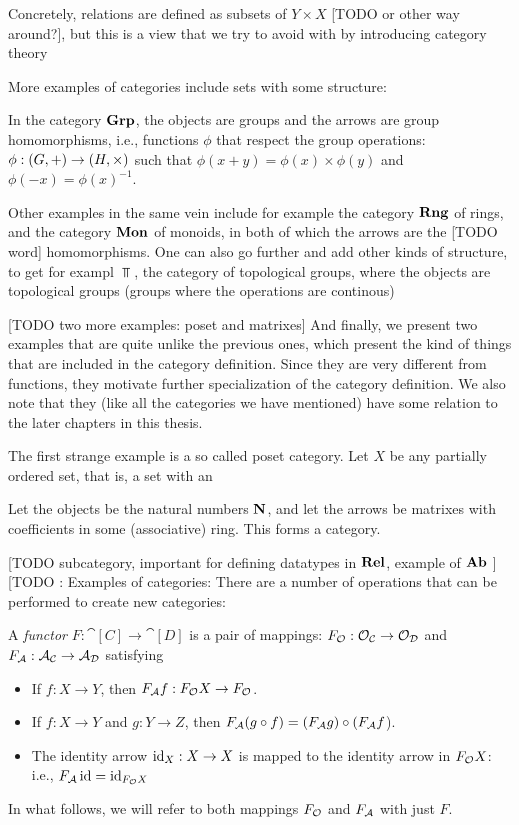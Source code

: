 \documentclass{article}
\begin{document}
Concretely, relations are defined as subsets of $Y \times X$ [TODO or other way around?], but this is a view that we try to avoid with by introducing category theory 

More examples of categories include sets with some structure:
\begin{Ex}
  In the category $\Grp$, the objects are groups and the arrows are group homomorphisms, i.e., functions $\phi$ that respect the group operations: $\phi : \grp{G}{+} \to \grp{H}{\times}$ such that $\phi(x + y) = \phi(x) \times \phi(y)$ and $\phi(-x) = \phi(x)^{-1}$.
\end{Ex}
\begin{Ex}
Other examples in the same vein include for example the category $\Rng$ of rings, and the category $\Mon$ of monoids, in both of which the arrows are the [TODO word] homomorphisms. One can also go further and add other kinds of structure, to get for exampl $\Top$, the category of topological groups, where the objects are topological groups (groups where the operations are continous)
\end{Ex}
[TODO two more examples: poset and matrixes]
And finally, we present two examples that are quite unlike the previous ones, which present the kind of things that are included in the category definition. Since they are very different from functions, they motivate further specialization of the category definition. We also note that they (like all the categories we have mentioned) have some relation to the later chapters in this thesis.
\begin{Ex}
The first strange example is a so called poset category. Let $X$ be any partially ordered set, that is, a set with an 
\end{Ex}
\begin{Ex}
Let the objects be the natural numbers $\N$, and let the arrows be matrixes with coefficients in some (associative) ring. This forms a category.
\end{Ex}
[TODO subcategory, important for defining datatypes in $\Rel$, example of $\Ab$ ]
[TODO : Examples of categories:
There are a number of operations that can be performed to create new categories:


\begin{Def}
A \emph{functor} $F : \cat[C] \to \cat[D]$ is a pair of mappings:  $F_{\obj} : \obj_{\cat[C]} \to \obj_{\cat[D]}$ and $F_{\arr} : \arr_{\cat[C]} \to \arr_{\cat[D]}$ satisfying
\begin{itemize}
\item If $f : X \to Y$, then $F_{\arr} f : F_{\obj} X \to F_{\obj}$.
\item If $f : X \to Y$ and $g : Y \to Z$, then $F_{\arr} (g \comp f) = (F_{\arr} g) \comp (F_{\arr} f$).
\item The identity arrow $\id_X : X \to X$ is mapped to the identity arrow in $F_{\obj} X$: i.e., $F_{\arr} \id = \id_{F_{\obj}X}$
\end{itemize}
\end{Def}
In what follows, we will refer to both mappings $F_{\obj}$ and $F_{\arr}$ with just $F$.
\end{document}
